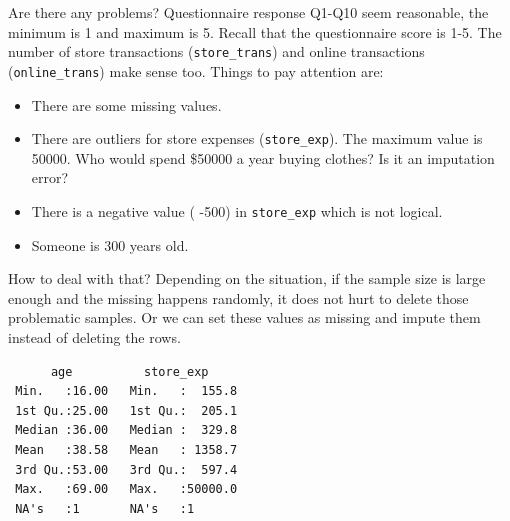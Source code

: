 \documentclass[12pt,]{krantz}
\makeatletter
\newenvironment{Shaded}{\begin{snugshade}}{\end{snugshade}}
\newcommand{\CommentTok}[1]{\textcolor[rgb]{0.37,0.37,0.37}{\textit{#1}}}
\newcommand{\DataTypeTok}[1]{\textcolor[rgb]{0.27,0.27,0.27}{#1}}
\newcommand{\DecValTok}[1]{\textcolor[rgb]{0.06,0.06,0.06}{#1}}
\newcommand{\KeywordTok}[1]{\textcolor[rgb]{0.27,0.27,0.27}{\textbf{#1}}}
\newcommand{\NormalTok}[1]{#1}
\newcommand{\OperatorTok}[1]{\textcolor[rgb]{0.43,0.43,0.43}{\textbf{#1}}}
\newcommand{\OtherTok}[1]{\textcolor[rgb]{0.37,0.37,0.37}{#1}}
\newcommand{\StringTok}[1]{\textcolor[rgb]{0.5,0.5,0.5}{#1}}
\providecommand{\tightlist}{%
  \setlength{\itemsep}{0pt}\setlength{\parskip}{0pt}}
\newenvironment{kframe}{%
\medskip{}
\setlength{\fboxsep}{.8em}
 \def\at@end@of@kframe{}%
 \ifinner\ifhmode%
  \def\at@end@of@kframe{\end{minipage}}%
  \begin{minipage}{\columnwidth}%
 \fi\fi%
 \def\FrameCommand##1{\hskip\@totalleftmargin \hskip-\fboxsep
 \colorbox{shadecolor}{##1}\hskip-\fboxsep
     \hskip-\linewidth \hskip-\@totalleftmargin \hskip\columnwidth}%
 \MakeFramed {\advance\hsize-\width
   \@totalleftmargin\z@ \linewidth\hsize
   \@setminipage}}%
 {\par\unskip\endMakeFramed%
 \at@end@of@kframe}
\renewenvironment{Shaded}{\begin{kframe}}{\end{kframe}}
\makeatother
\begin{document}
Are there any problems? Questionnaire response Q1-Q10 seem reasonable, the minimum is 1 and maximum is 5. Recall that the questionnaire score is 1-5. The number of store transactions (\texttt{store\_trans}) and online transactions (\texttt{online\_trans}) make sense too. Things to pay attention are:

\begin{itemize}
\tightlist
\item
  There are some missing values.
\item
  There are outliers for store expenses (\texttt{store\_exp}). The maximum value is 50000. Who would spend \$50000 a year buying clothes? Is it an imputation error?
\item
  There is a negative value ( -500) in \texttt{store\_exp} which is not logical.
\item
  Someone is 300 years old.
\end{itemize}

How to deal with that? Depending on the situation, if the sample size is large enough and the missing happens randomly, it does not hurt to delete those problematic samples. Or we can set these values as missing and impute them instead of deleting the rows.

\begin{Shaded}
\end{Shaded}

\begin{verbatim}
      age          store_exp      
 Min.   :16.00   Min.   :  155.8  
 1st Qu.:25.00   1st Qu.:  205.1  
 Median :36.00   Median :  329.8  
 Mean   :38.58   Mean   : 1358.7  
 3rd Qu.:53.00   3rd Qu.:  597.4  
 Max.   :69.00   Max.   :50000.0  
 NA's   :1       NA's   :1        
\end{verbatim}
\end{document}
